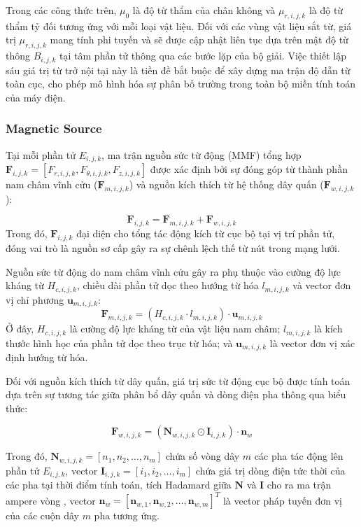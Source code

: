 Trong các công thức trên, $\mu_0$ là độ từ thẩm của chân không và $\mu_{r,i,j,k}$ là độ từ thẩm tỷ đối tương ứng với mỗi loại vật liệu. Đối với các vùng vật liệu sắt từ, giá trị $\mu_{r,i,j,k}$ mang tính phi tuyến và sẽ được cập nhật liên tục dựa trên mật độ từ thông $B_{i,j,k}$ tại tâm phần tử thông qua các bước lặp của bộ giải. Việc thiết lập sáu giá trị từ trở nội tại này là tiền đề bắt buộc để xây dựng ma trận độ dẫn từ toàn cục, cho phép mô hình hóa sự phân bố trường trong toàn bộ miền tính toán của máy điện.

\subsubsection{Magnetic Source}
Tại mỗi phần tử $E_{i,j,k}$, ma trận nguồn sức từ động (MMF) tổng hợp $\mathbf{F}_{i,j,k} = [F_{r,i,j,k},F_{\theta,i,j,k},F_{z,i,j,k}]$ được xác định bởi sự đóng góp từ thành phần nam châm vĩnh cửu ($\mathbf{F}_{m,i,j,k}$) và nguồn kích thích từ hệ thống dây quấn ($\mathbf{F}_{w,i,j,k}$):

\begin{equation}
    \mathbf{F}_{i,j,k} = \mathbf{F}_{m,i,j,k} + \mathbf{F}_{w,i,j,k}
\end{equation}
Trong đó, $\mathbf{F}_{i,j,k}$ đại diện cho tổng tác động kích từ cục bộ tại vị trí phần tử, đóng vai trò là nguồn sơ cấp gây ra sự chênh lệch thế từ nút trong mạng lưới.

Nguồn sức từ động do nam châm vĩnh cửu gây ra phụ thuộc vào cường độ lực kháng từ $H_{c,i,j,k}$, chiều dài phần tử dọc theo hướng từ hóa $l_{m,i,j,k}$ và vector đơn vị chỉ phương $\mathbf{u}_{m,i,j,k}$:
\begin{equation}
    \mathbf{F}_{m,i,j,k} = (H_{c,i,j,k} \cdot l_{m,i,j,k}) \cdot \mathbf{u}_{m,i,j,k}
\end{equation}
Ở đây, $H_{c,i,j,k}$ là cường độ lực kháng từ của vật liệu nam châm; $l_{m,i,j,k}$ là kích thước hình học của phần tử dọc theo trục từ hóa; và $\mathbf{u}_{m,i,j,k}$ là vector đơn vị xác định hướng từ hóa.

Đối với nguồn kích thích từ dây quấn, giá trị sức từ động cục bộ được tính toán dựa trên sự tương tác giữa phân bổ dây quấn và dòng điện pha thông qua biểu thức:

\begin{equation}
    \mathbf{F}_{w,i,j,k} = (\mathbf{N}_{w,i,j,k} \odot \mathbf{I}_{i,j,k}) \cdot \mathbf{n}_w
\end{equation}

Trong đó, $\mathbf{N}_{w,i,j,k} = [n_1, n_2, \dots, n_m]$ chứa số vòng dây $m$ các pha tác động lên phần tử $E_{i,j,k}$, vector $\mathbf{I}_{i,j,k} =[i_1, i_2, \dots, i_m] $ chứa giá trị dòng điện tức thời của các pha tại thời điểm tính toán, tích Hadamard giữa $\mathbf{N}$ và $\mathbf{I}$ cho ra ma trận ampere vòng , vector $\mathbf{n}_w = [\mathbf{n}_{w,1},\mathbf{n}_{w,2}, \dots, \mathbf{n}_{w,m}]^T $ là vector pháp tuyến đơn vị của các cuộn dây $m$ pha tương ứng.

